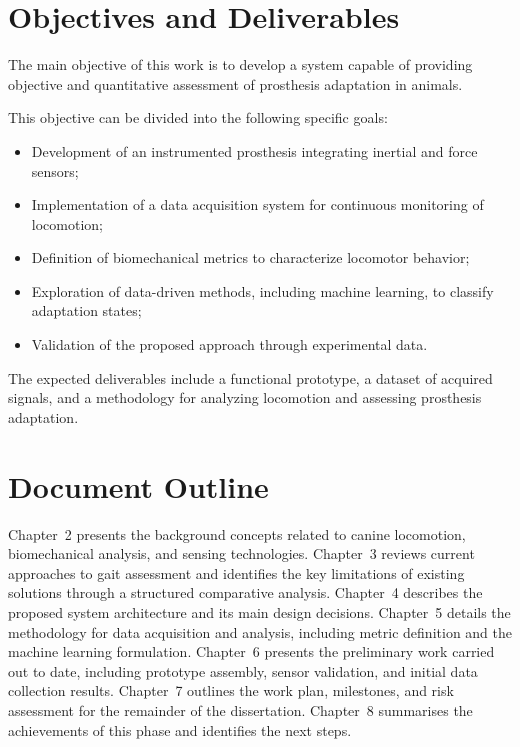 \section{Objectives and Deliverables}

The main objective of this work is to develop a system capable of providing objective and quantitative assessment of prosthesis adaptation in animals.

This objective can be divided into the following specific goals:

\begin{itemize}
    \item Development of an instrumented prosthesis integrating inertial and force sensors;
    \item Implementation of a data acquisition system for continuous monitoring of locomotion;
    \item Definition of biomechanical metrics to characterize locomotor behavior;
    \item Exploration of data-driven methods, including machine learning, to classify adaptation states;
    \item Validation of the proposed approach through experimental data.
\end{itemize}

The expected deliverables include a functional prototype, a dataset of acquired signals, and a methodology for analyzing locomotion and assessing prosthesis adaptation.

\section{Document Outline}

Chapter~2 presents the background concepts related to canine locomotion,
biomechanical analysis, and sensing technologies.
Chapter~3 reviews current approaches to gait assessment and identifies the
key limitations of existing solutions through a structured comparative analysis.
Chapter~4 describes the proposed system architecture and its main design
decisions.
Chapter~5 details the methodology for data acquisition and analysis, including
metric definition and the machine learning formulation.
Chapter~6 presents the preliminary work carried out to date, including
prototype assembly, sensor validation, and initial data collection results.
Chapter~7 outlines the work plan, milestones, and risk assessment for the
remainder of the dissertation.
Chapter~8 summarises the achievements of this phase and identifies the
next steps.